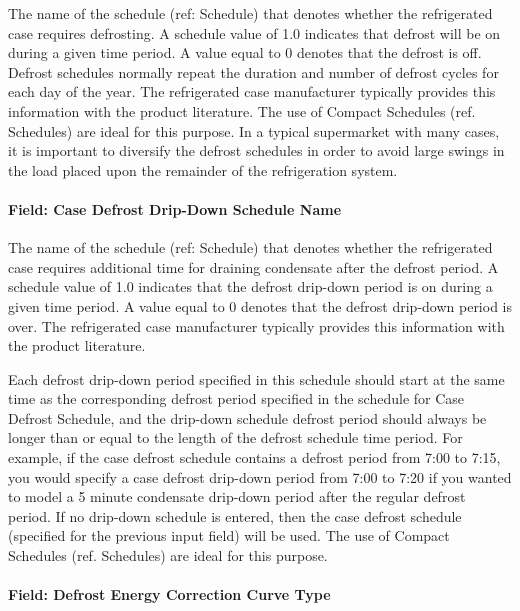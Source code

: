 The name of the schedule (ref: Schedule) that denotes whether the refrigerated case requires defrosting. A schedule value of 1.0 indicates that defrost will be on during a given time period. A value equal to 0 denotes that the defrost is off. Defrost schedules normally repeat the duration and number of defrost cycles for each day of the year. The refrigerated case manufacturer typically provides this information with the product literature. The use of Compact Schedules (ref. Schedules) are ideal for this purpose. In a typical supermarket with many cases, it is important to diversify the defrost schedules in order to avoid large swings in the load placed upon the remainder of the refrigeration system.

\paragraph{Field: Case Defrost Drip-Down Schedule Name}\label{field-case-defrost-drip-down-schedule-name}

The name of the schedule (ref: Schedule) that denotes whether the refrigerated case requires additional time for draining condensate after the defrost period. A schedule value of 1.0 indicates that the defrost drip-down period is on during a given time period. A value equal to 0 denotes that the defrost drip-down period is over. The refrigerated case manufacturer typically provides this information with the product literature.

Each defrost drip-down period specified in this schedule should start at the same time as the corresponding defrost period specified in the schedule for Case Defrost Schedule, and the drip-down schedule defrost period should always be longer than or equal to the length of the defrost schedule time period. For example, if the case defrost schedule contains a defrost period from 7:00 to 7:15, you would specify a case defrost drip-down period from 7:00 to 7:20 if you wanted to model a 5 minute condensate drip-down period after the regular defrost period. If no drip-down schedule is entered, then the case defrost schedule (specified for the previous input field) will be used. The use of Compact Schedules (ref. Schedules) are ideal for this purpose.

\paragraph{Field: Defrost Energy Correction Curve Type}\label{field-defrost-energy-correction-curve-type}

